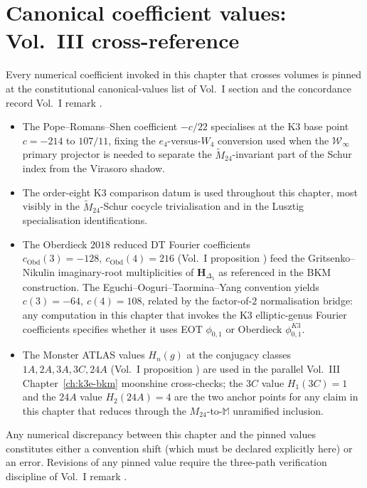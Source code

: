 \section{Canonical coefficient values: Vol.~III
cross-reference}
\label{sec:k3-chiral-bialgebra-canonical-values}

\begin{remark}
\label{rem:k3-chiral-bialgebra-canonical-values}
Every numerical coefficient invoked in this chapter that crosses
volumes is pinned at the constitutional canonical-values list of
Vol.~I \cite{VolI} section
\cite{VolI} and the concordance
record Vol.~I \cite{VolI} remark
\cite{VolI}.
\begin{itemize}
 \item The Pope--Romans--Shen coefficient $-c/22$ specialises at
 the K3 base point $c=-214$ to $107/11$, fixing the
 $e_4$-versus-$W_4$ conversion used when the $\mathcal W_\infty$
 primary projector is needed to separate
 the $\widetilde M_{24}$-invariant part of the Schur index
 from the Virasoro shadow.
 \item The order-eight K3 comparison datum is used throughout this
 chapter, most visibly in the \(\widetilde M_{24}\)-Schur cocycle
 trivialisation and in the Lusztig specialisation identifications.
 \item The Oberdieck $2018$ reduced DT Fourier coefficients
 $c_{\mathrm{Obd}}(3) = -128,\ c_{\mathrm{Obd}}(4) = 216$
 \textup{(}Vol.~I proposition
 \cite{VolI}\textup{)}
 feed the Gritsenko--Nikulin imaginary-root multiplicities
 of $\mathbf H_{\Delta_5}$ as referenced in the BKM
 construction. The Eguchi--Ooguri--Taormina--Yang convention
 yields $c(3) = -64,\ c(4) = 108$, related by the
 factor-of-$2$ normalisation bridge: any computation in this
 chapter that invokes the K3 elliptic-genus Fourier
 coefficients specifies whether it uses EOT $\phi_{0,1}$ or
 Oberdieck $\phi_{0,1}^{K3}$.
 \item The Monster ATLAS values $H_n(g)$ at the conjugacy
 classes $1A, 2A, 3A, 3C, 24A$ \textup{(}Vol.~I proposition
 \cite{VolI}\textup{)} are used
 in the parallel Vol.~III Chapter~\ref{ch:k3e-bkm}
 moonshine cross-checks; the $3C$ value $H_1(3C) = 1$ and
 the $24A$ value $H_2(24A) = 4$ are the two anchor points
 for any claim in this chapter that reduces through the
 $M_{24}$-to-$\mathbb M$ unramified inclusion.
\end{itemize}
Any numerical discrepancy between this chapter and the pinned
values constitutes either a convention shift \textup{(}which must
be declared explicitly here\textup{)} or an error. Revisions of
any pinned value require the three-path verification discipline
of Vol.~I remark
\cite{VolI}.
\end{remark}

